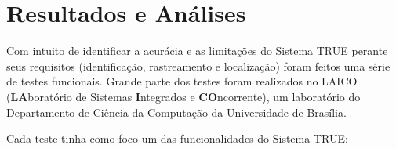 \chapter{Resultados e Análises}


	Com intuito de identificar a acurácia e as limitações do Sistema TRUE perante seus requisitos (identificação, rastreamento e localização) foram feitos uma série de testes funcionais. Grande parte dos testes foram realizados no LAICO (\textbf{LA}boratório de Sistemas \textbf{I}ntegrados e \textbf{CO}ncorrente), um laboratório do Departamento de Ciência da Computação da Universidade de Brasília. 



	Cada teste tinha como foco um das funcionalidades do Sistema TRUE:


